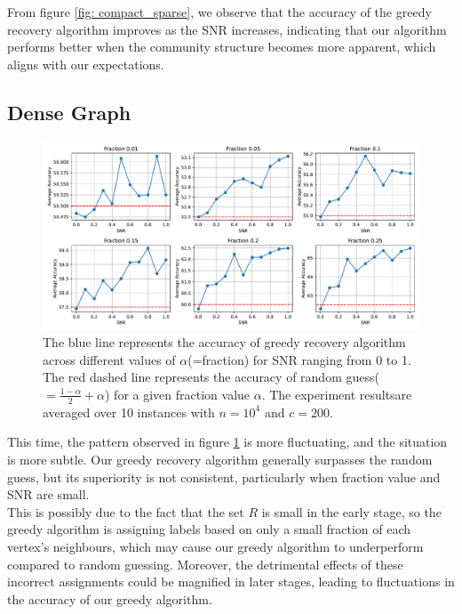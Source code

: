 From figure \ref{fig: compact_sparse}, we observe that the accuracy of the greedy recovery algorithm improves as the SNR increases, indicating that our algorithm performs better when the community structure becomes more apparent, which aligns with our expectations.
\clearpage
\subsection{Dense Graph}
\begin{figure}[H]
    \centering
    \includegraphics[width=1\linewidth]{Figures/Greedy_Recovery_super_dense_3.pdf}
    \caption[Accuracy of Greedy Recovery Algorithm in Dense Graph with $k=2$]{The blue line represents the accuracy of greedy recovery algorithm across different values of $\alpha$(=fraction) for SNR ranging from 0 to 1. The red dashed line represents the accuracy of random guess($=\frac{1-\alpha}{2}+\alpha$) for a given fraction value $\alpha$. The experiment results\protect\footnotemark are averaged over 10 instances with $n=10^4$ and $c=200.$}
    \label{fig:greedy_dense}
\end{figure}
This time, the pattern observed in figure \ref{fig:greedy_dense} is more fluctuating, and the situation is more subtle. Our greedy recovery algorithm generally surpasses the random guess, but its superiority is not consistent, particularly when fraction value and SNR are small.\\
This is possibly due to the fact that the set $R$ is small in the early stage, so the greedy algorithm is assigning labels based on only a small fraction of each vertex's neighbours, which may cause our greedy algorithm to underperform compared to random guessing. Moreover, the detrimental effects of these incorrect assignments could be magnified in later stages, leading to fluctuations in the accuracy of our greedy algorithm.
\clearpage

